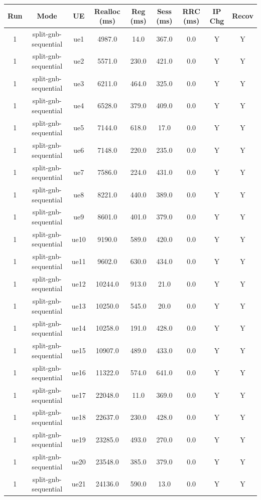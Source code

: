 \begin{table}[ht]
\centering
\begin{tabular}{|c|c|c|c|c|c|c|c|c|}
\hline
Run & Mode & UE & Realloc (ms) & Reg (ms) & Sess (ms) & RRC (ms) & IP Chg & Recov \\
\hline
1 & split-gnb-sequential & ue1 & 4987.0 & 14.0 & 367.0 & 0.0 & Y & Y \\
1 & split-gnb-sequential & ue2 & 5571.0 & 230.0 & 421.0 & 0.0 & Y & Y \\
1 & split-gnb-sequential & ue3 & 6211.0 & 464.0 & 325.0 & 0.0 & Y & Y \\
1 & split-gnb-sequential & ue4 & 6528.0 & 379.0 & 409.0 & 0.0 & Y & Y \\
1 & split-gnb-sequential & ue5 & 7144.0 & 618.0 & 17.0 & 0.0 & Y & Y \\
1 & split-gnb-sequential & ue6 & 7148.0 & 220.0 & 235.0 & 0.0 & Y & Y \\
1 & split-gnb-sequential & ue7 & 7586.0 & 224.0 & 431.0 & 0.0 & Y & Y \\
1 & split-gnb-sequential & ue8 & 8221.0 & 440.0 & 389.0 & 0.0 & Y & Y \\
1 & split-gnb-sequential & ue9 & 8601.0 & 401.0 & 379.0 & 0.0 & Y & Y \\
1 & split-gnb-sequential & ue10 & 9190.0 & 589.0 & 420.0 & 0.0 & Y & Y \\
1 & split-gnb-sequential & ue11 & 9602.0 & 630.0 & 434.0 & 0.0 & Y & Y \\
1 & split-gnb-sequential & ue12 & 10244.0 & 913.0 & 21.0 & 0.0 & Y & Y \\
1 & split-gnb-sequential & ue13 & 10250.0 & 545.0 & 20.0 & 0.0 & Y & Y \\
1 & split-gnb-sequential & ue14 & 10258.0 & 191.0 & 428.0 & 0.0 & Y & Y \\
1 & split-gnb-sequential & ue15 & 10907.0 & 489.0 & 433.0 & 0.0 & Y & Y \\
1 & split-gnb-sequential & ue16 & 11322.0 & 574.0 & 641.0 & 0.0 & Y & Y \\
1 & split-gnb-sequential & ue17 & 22048.0 & 11.0 & 369.0 & 0.0 & Y & Y \\
1 & split-gnb-sequential & ue18 & 22637.0 & 230.0 & 428.0 & 0.0 & Y & Y \\
1 & split-gnb-sequential & ue19 & 23285.0 & 493.0 & 270.0 & 0.0 & Y & Y \\
1 & split-gnb-sequential & ue20 & 23548.0 & 385.0 & 379.0 & 0.0 & Y & Y \\
1 & split-gnb-sequential & ue21 & 24136.0 & 590.0 & 13.0 & 0.0 & Y & Y \\

\end{tabular}
\end{table}
